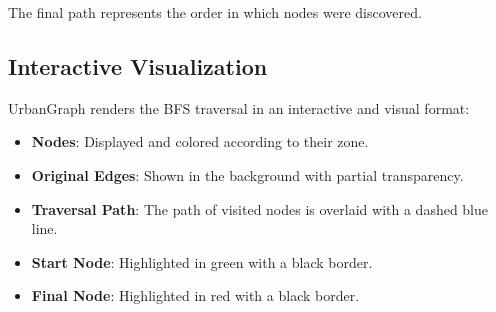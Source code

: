 \documentclass[12pt]{article}
\begin{document}
The final path represents the order in which nodes were discovered.

\subsection*{Interactive Visualization}

UrbanGraph renders the BFS traversal in an interactive and visual format:
\begin{itemize}
    \item \textbf{Nodes}: Displayed and colored according to their zone.
    \item \textbf{Original Edges}: Shown in the background with partial transparency.
    \item \textbf{Traversal Path}: The path of visited nodes is overlaid with a dashed blue line.
    \item \textbf{Start Node}: Highlighted in green with a black border.
    \item \textbf{Final Node}: Highlighted in red with a black border.
\end{itemize}
\end{document}
